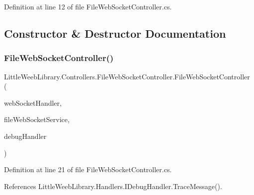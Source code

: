 Definition at line 12 of file File\+Web\+Socket\+Controller.\+cs.



\subsection{Constructor \& Destructor Documentation}
\mbox{\label{class_little_weeb_library_1_1_controllers_1_1_file_web_socket_controller_a6e297614bf4d98314e6d3583ccdf6dae}} 
\subsubsection{\texorpdfstring{File\+Web\+Socket\+Controller()}{FileWebSocketController()}}
{\footnotesize\ttfamily Little\+Weeb\+Library.\+Controllers.\+File\+Web\+Socket\+Controller.\+File\+Web\+Socket\+Controller (\begin{DoxyParamCaption}\item[{\mbox{\hyperlink{interface_little_weeb_library_1_1_handlers_1_1_i_web_socket_handler}{I\+Web\+Socket\+Handler}}}]{web\+Socket\+Handler,  }\item[{\mbox{\hyperlink{interface_little_weeb_library_1_1_services_1_1_i_file_web_socket_service}{I\+File\+Web\+Socket\+Service}}}]{file\+Web\+Socket\+Service,  }\item[{\mbox{\hyperlink{interface_little_weeb_library_1_1_handlers_1_1_i_debug_handler}{I\+Debug\+Handler}}}]{debug\+Handler }\end{DoxyParamCaption})}



Definition at line 21 of file File\+Web\+Socket\+Controller.\+cs.



References Little\+Weeb\+Library.\+Handlers.\+I\+Debug\+Handler.\+Trace\+Message().


